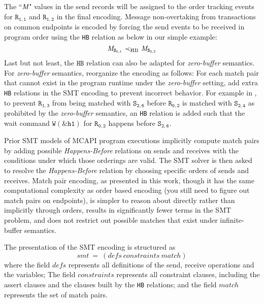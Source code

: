 The ``$\emph{M}$" values in the send records will be assigned to the order tracking events for $\mathtt{R_{1,1}}$ and $\mathtt{R_{1,2}}$ in the final encoding. Message non-overtaking from transactions on common endpoints is encoded by forcing the send events to be received in program order using the \texttt{HB} relation as below in our simple example:
\[\cfgnt{M}_\mathtt{S_{0,1}}\ \mathrm{\prec_{HB}}\ \cfgnt{M}_\mathtt{S_{0,2}}\]
Last but not least, the $\mathtt{HB}$ relation can also be adapted for \textit{zero-buffer} semantics. For \textit{zero-buffer} semantics, reorganize the encoding as follows: For each match pair that cannot exist in the program runtime under the \textit{zero-buffer} setting, add extra \texttt{HB} relations in the SMT encoding to prevent incorrect behavior. For example in , to prevent $\mathtt{R_{1,3}}$ from being matched with $\mathtt{S_{2,6}}$ before $\mathtt{R_{0,2}}$ is matched with $\mathtt{S_{2,4}}$ as prohibited by the \textit{zero-buffer} semantics, an \texttt{HB} relation is added such that the wait command $\mathtt{W(\&h1)}$ for $\mathtt{R_{0,2}}$ happens before $\mathtt{S_{2,6}}$.


Prior SMT models of MCAPI program executions implicitly compute
match pairs by adding possible \emph{Happens-Before} relations on sends and
receives with the conditions under which those orderings are
valid. The SMT solver is then asked to resolve the \emph{Happens-Before}
relation by choosing specific orders of sends and receives. Match pair
encoding, as presented in this work, though it has the same
computational complexity as order based encoding (you still need to
figure out match pairs on endpoints), is simpler to reason about
directly rather than implicitly through orders, results in
significantly fewer terms in the SMT problem, and does not restrict out possible matches that exist under infinite-buffer semantics.

The presentation of the SMT encoding is structured as
\[\mathit{smt}\ =\ (\mathit{defs}\ \mathit{constraints}\ \mathit{match})\]
where the field $\mathit{defs}$ represents all definitions of the send, receive operations and the variables; The field $\mathit{constraints}$ represents all constraint clauses, including the assert clauses and the clauses built by the \texttt{HB} relations; and the field $\mathit{match}$ represents the set of match pairs.

